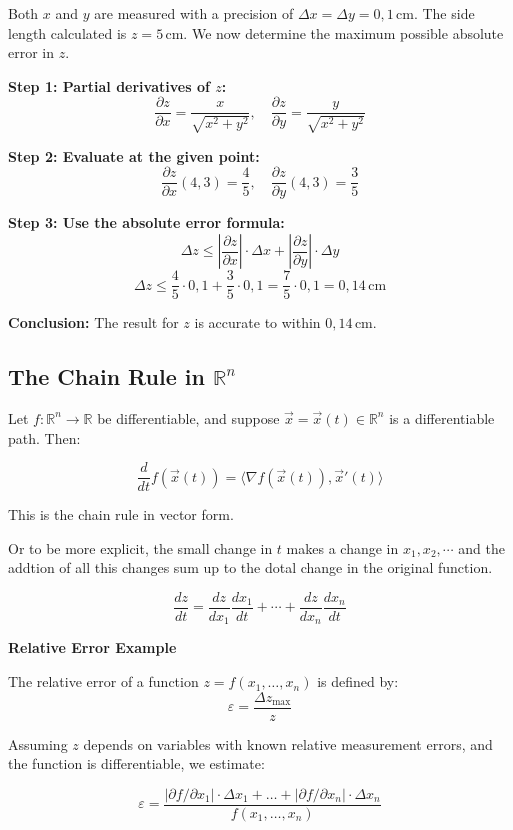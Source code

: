 Both \( x \) and \( y \) are measured with a precision of \( \Delta x = \Delta y = 0{,}1 \, \text{cm} \). The side length calculated is \( z = 5 \, \text{cm} \). We now determine the maximum possible absolute error in \( z \).

\textbf{Step 1: Partial derivatives of \( z \):}
\[
\frac{\partial z}{\partial x} = \frac{x}{\sqrt{x^2 + y^2}}, \quad
\frac{\partial z}{\partial y} = \frac{y}{\sqrt{x^2 + y^2}}
\]

\textbf{Step 2: Evaluate at the given point:}
\[
\frac{\partial z}{\partial x}(4, 3) = \frac{4}{5}, \quad
\frac{\partial z}{\partial y}(4, 3) = \frac{3}{5}
\]

\textbf{Step 3: Use the absolute error formula:}
\[
\Delta z \leq \left| \frac{\partial z}{\partial x} \right| \cdot \Delta x + \left| \frac{\partial z}{\partial y} \right| \cdot \Delta y
\]
\[
\Delta z \leq \frac{4}{5} \cdot 0{,}1 + \frac{3}{5} \cdot 0{,}1 = \frac{7}{5} \cdot 0{,}1 = 0{,}14 \, \text{cm}
\]

\textbf{Conclusion:}  
The result for \( z \) is accurate to within \( \boxed{0{,}14 \, \text{cm}} \).


\subsection{The Chain Rule in \( \mathbb{R}^n \)}

Let \( f : \mathbb{R}^n \to \mathbb{R} \) be differentiable, and suppose \( \vec{x} = \vec{x}(t) \in \mathbb{R}^n \) is a differentiable path. Then:

\[
\frac{d}{dt} f(\vec{x}(t)) = \langle \nabla f(\vec{x}(t)), \vec{x}'(t) \rangle
\]

This is the chain rule in vector form.

Or to be more explicit, the small change in \(t\) makes a change in \(x_1, x_2, \cdots\) and the addtion of all this changes
sum up to the dotal change in the original function.

\[
\frac{dz}{dt} = \frac{dz}{dx_1}\frac{dx_1}{dt} + \cdots + \frac{dz}{dx_n}\frac{dx_n}{dt}
\]

\textbf{Relative Error Example}

The relative error of a function \( z = f(x_1, \dots, x_n) \) is defined by:
\[
\varepsilon = \frac{\Delta z_{\max}}{z}
\]

Assuming \( z \) depends on variables with known relative measurement errors, and the function is differentiable, we estimate:

\[
\varepsilon = \frac{|\partial f / \partial x_1| \cdot \Delta x_1 + \dots + |\partial f / \partial x_n| \cdot \Delta x_n}{f(x_1, \dots, x_n)}
\]

